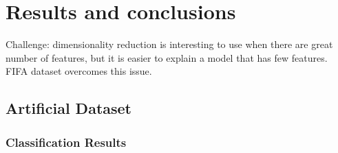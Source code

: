 
\chapter{Results and conclusions}

Challenge: dimensionality reduction is interesting to use when there are great number of features, but it is easier to explain a model that has few features. FIFA dataset overcomes this issue.


\section{Artificial Dataset}

\subsection{Classification Results}


